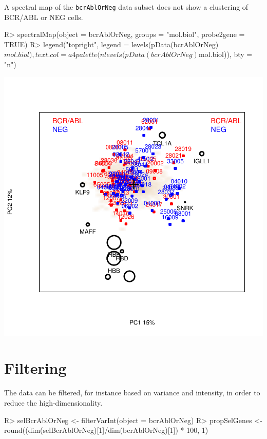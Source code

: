 \documentclass[a4paper]{article}
\begin{document}
A spectral map of the \texttt{bcrAblOrNeg} data subset does not show a clustering of BCR/ABL or NEG cells.

\begin{Schunk}
\begin{Sinput}
R> spectralMap(object = bcrAblOrNeg, groups = "mol.biol", 
     probe2gene = TRUE)
R> legend("topright", legend = levels(pData(bcrAblOrNeg)$mol.biol), 
     text.col = a4palette(nlevels(pData(bcrAblOrNeg)$mol.biol)), 
     bty = "n")
\end{Sinput}
\end{Schunk}
\includegraphics{a4vignette-spectralMapALLSubset}

\section{Filtering}
The data can be filtered, for instance based on variance and intensity, in order to reduce
 the high-dimensionality.

\begin{Schunk}
\begin{Sinput}
R> selBcrAblOrNeg <- filterVarInt(object = bcrAblOrNeg)
R> propSelGenes <- round((dim(selBcrAblOrNeg)[1]/dim(bcrAblOrNeg)[1]) * 
     100, 1)
\end{Sinput}
\end{Schunk}
\end{document}

